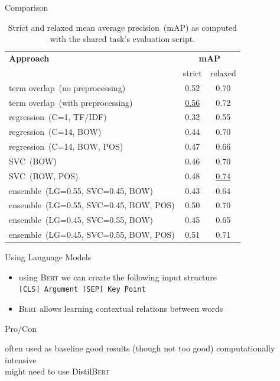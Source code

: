 \documentclass[english,handout]{mlutalk}
\newcommand{\Bert}{\textsc{Bert}\xspace}
\newcommand{\DistilBert}{Distil\textsc{Bert}\xspace}
\newcommand{\TFIDF}{\mbox{TF/IDF}\xspace}
\newcommand{\mAP}{\mbox{mAP}\xspace}
\begin{document}
\begin{frame}{Comparison}
  \begin{table}
    \centering
    \caption{Strict and relaxed mean average precision~(\mAP) as computed with the shared task's evaluation script.}
    \begin{tabular}{lcc}
      \toprule
      \textbf{Approach} & \multicolumn{2}{c}{\textbf{\mAP}} \\
      & strict & relaxed \\
      \midrule
      term overlap~(no preprocessing) & 0.52 & 0.70 \\
      term overlap~(with preprocessing) & \underline{0.56} & 0.72 \\
      regression~(C=1, \TFIDF) & 0.32 & 0.55 \\
      regression~(C=14, BOW) & 0.44 & 0.70 \\
      regression~(C=14, BOW, POS) & 0.47 & 0.66 \\
      SVC~(BOW) & 0.46 & 0.70 \\
      SVC~(BOW, POS) & 0.48 & \underline{0.74} \\
      ensemble~(LG=0.55, SVC=0.45, BOW) & 0.43 & 0.64 \\
      ensemble~(LG=0.55, SVC=0.45, BOW, POS) & 0.50 & 0.70 \\
      ensemble~(LG=0.45, SVC=0.55, BOW) & 0.45 & 0.65 \\
      ensemble~(LG=0.45, SVC=0.55, BOW, POS) & 0.51 & 0.71 \\
      \bottomrule
    \end{tabular}
  \end{table}
\end{frame}

\begin{frame}{Using Language Models}

  \begin{itemize}
    \item using \Bert we can create the following input structure \\
    \lstinline{[CLS] Argument [SEP] Key Point}
    \item \Bert allows learning contextual relations between words
  \end{itemize}

  \begin{block}{Pro/Con}
    \begin{itemize}
      \pro often used as baseline
      \pro good results (though not too good)
      \con computationally intensive \\ might need to use \DistilBert
    \end{itemize}
  \end{block}

\end{frame}
\end{document}
